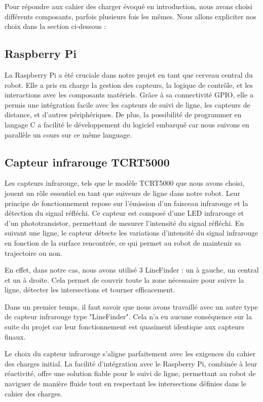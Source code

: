Pour répondre aux cahier des charger évoqué en introduction, nous avons choisi différents composants, parfois plusieurs fois les mêmes. Nous allons expliciter nos choix dans la section ci-dessous :

\subsection{Raspberry Pi}
La Raspberry Pi a été cruciale dans notre projet en tant que cerveau central du robot. Elle a pris en charge la gestion des capteurs, la logique de contrôle, et les interactions avec les composants matériels. Grâce à sa connectivité GPIO, elle a permis une intégration facile avec les capteurs de suivi de ligne, les capteurs de distance, et d'autres périphériques. De plus, la possibilité de programmer en langage C a facilité le développement du logiciel embarqué car nous suivons en parallèle un cours sur ce même language.

\subsection{Capteur infrarouge TCRT5000}
Les capteurs infrarouge, tels que le modèle TCRT5000 que nous avons choisi, jouent un rôle essentiel en tant que suiveurs de ligne dans notre robot. Leur principe de fonctionnement repose sur l'émission d'un faisceau infrarouge et la détection du signal réfléchi. Ce capteur est composé d'une LED infrarouge et d'un phototransistor, permettant de mesurer l'intensité du signal réfléchi. En suivant une ligne, le capteur détecte les variations d'intensité du signal infrarouge en fonction de la surface rencontrée, ce qui permet au robot de maintenir sa trajectoire ou non.

En effet, dans notre cas, nous avons utilisé 3 LineFinder : un à gauche, un central et un à droite. Cela permet de couvrir toute la zone nécessaire pour suivre la ligne, détecter les intersections et tourner efficacement.

Dans un premier temps, il faut savoir que nous avons travaillé avec un autre type de capteur infrarouge type "LineFinder". Cela n'a eu aucune conséquence sur la suite du projet car leur fonctionnement est quasiment identique aux capteurs finaux.

Le choix du capteur infrarouge s'aligne parfaitement avec les exigences du cahier des charges initial. La facilité d'intégration avec le Raspberry Pi, combinée à leur réactivité, offre une solution fiable pour le suivi de ligne, permettant au robot de naviguer de manière fluide tout en respectant les intersections définies dans le cahier des charges.

